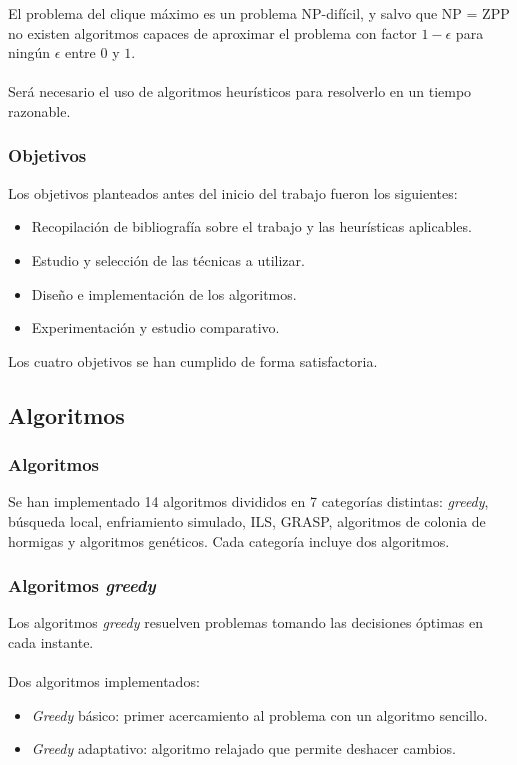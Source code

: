 \documentclass{beamer}
\theoremstyle{theorem}
\begin{document}
\begin{frame}

  El problema del clique máximo es un problema NP-difícil, y salvo que NP = ZPP no existen algoritmos capaces de aproximar el
  problema con factor $1-\epsilon$ para ningún $\epsilon$ entre $0$ y $1$. \\~\\

  Será necesario el uso de algoritmos heurísticos para resolverlo en un tiempo razonable.
\end{frame}


\begin{frame}
  \frametitle{Objetivos}
  Los objetivos planteados antes del inicio del trabajo fueron los siguientes:
  \begin{itemize}
    \item Recopilación de bibliografía sobre el trabajo y las heurísticas aplicables.
    \item Estudio y selección de las técnicas a utilizar.
    \item Diseño e implementación de los algoritmos.
    \item Experimentación y estudio comparativo.
  \end{itemize}

  Los cuatro objetivos se han cumplido de forma satisfactoria.

\end{frame}


\subsection{Algoritmos}

\begin{frame}
  \frametitle{Algoritmos}
  Se han implementado 14 algoritmos divididos en 7 categorías distintas: \textit{greedy}, búsqueda local,
  enfriamiento simulado, ILS, GRASP, algoritmos de colonia de hormigas y algoritmos genéticos.
  Cada categoría incluye dos algoritmos.

\end{frame}

\begin{frame}
  \frametitle{Algoritmos \textit{greedy}}
  Los algoritmos \textit{greedy} resuelven problemas tomando las decisiones óptimas en cada instante. \\~\\

  Dos algoritmos implementados:
  \begin{itemize}
    \item \textit{Greedy} básico: primer acercamiento al problema con un algoritmo sencillo.
    \item \textit{Greedy} adaptativo: algoritmo relajado que permite deshacer cambios. \cite{grosso:2004}
  \end{itemize}

\end{frame}
\end{document}
